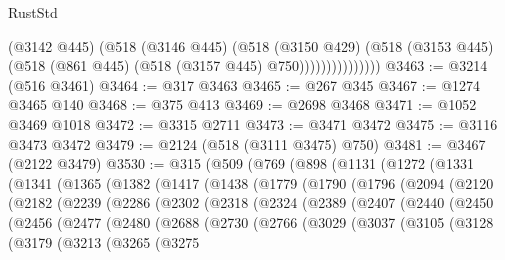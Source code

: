 \begin{lexlean}{RustStd}
\begin{coremodule}
{\begin{coremodule}
{{{{{{{{{{{{{{{{{{{{{{{{{{{{{{{{{{{{{{{{{{{{{{{{{{                        (@3142 @445)
                        (@518
                          (@3146 @445)
                          (@518
                            (@3150 @429)
                            (@518
                              (@3153 @445)
                              (@518 (@861 @445) (@518 (@3157 @445) @750)))))))))))))))
@3463 := @3214 (@516 @3461)
@3464 := @317 @3463
@3465 := @267 @345
@3467 := @1274 @3465 @140
@3468 := @375 @413
@3469 := @2698 @3468
@3471 := @1052 @3469 @1018
@3472 := @3315 @2711
@3473 := @3471 @3472
@3475 := @3116 @3473 @3472
@3479 := @2124 (@518 (@3111 @3475) @750)
@3481 := @3467 (@2122 @3479)
@3530 := @315
    (@509
      (@769
        (@898
          (@1131
            (@1272
              (@1331
                (@1341
                  (@1365
                    (@1382
                      (@1417
                        (@1438
                          (@1779
                            (@1790
                              (@1796
                                (@2094
                                  (@2120
                                    (@2182
                                      (@2239
                                        (@2286
                                          (@2302
                                            (@2318
                                              (@2324
                                                (@2389
                                                  (@2407
                                                    (@2440
                                                      (@2450
                                                        (@2456
                                                          (@2477
                                                            (@2480
                                                              (@2688
                                                                (@2730
                                                                  (@2766
                                                                    (@3029
                                                                      (@3037
                                                                        (@3105
                                                                          (@3128
                                                                            (@3179
                                                                              (@3213
                                                                                (@3265
                                                                                  (@3275
}}}}}}}}}}}}}}}}}}}}}}}}}}}}}}}}}}}}}}}}}}}}}}}}}}
\end{coremodule}}
\end{coremodule}
\end{lexlean}
